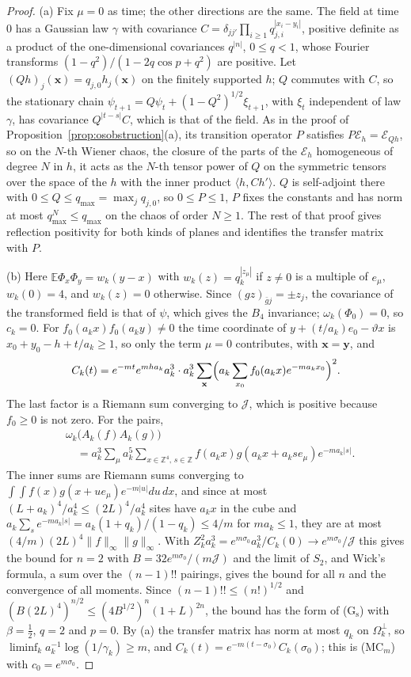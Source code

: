 \documentclass[aps,prd,twocolumn,superscriptaddress,nofootinbib,longbibliography,floatfix,amsmath,amssymb,10pt]{revtex4-2}
\theoremstyle{definition}
\theoremstyle{remark}
\newcommand{\Z}{\mathbb{Z}}
\newcommand{\E}{\mathbb{E}}
\newcommand{\ip}[2]{\langle #1,#2\rangle}
\begin{document}
\begin{proof}
(a) Fix $\mu=0$ as time; the other directions are the same. The field at
time $0$ has a Gaussian law $\gamma$ with covariance $C=\delta_{jj'}
\prod_{i\ge1}q_{j,i}^{|x_i-y_i|}$, positive definite as a product of the
one-dimensional covariances $q^{|n|}$, $0\le q<1$, whose Fourier transforms
$(1-q^2)/(1-2q\cos p+q^2)$ are positive. Let $(Qh)_j(\mathbf x)=q_{j,0}
h_j(\mathbf x)$ on the finitely supported $h$; $Q$ commutes with $C$, so the
stationary chain $\psi_{t+1}=Q\psi_t+(1-Q^2)^{1/2}\xi_{t+1}$, with $\xi_t$
independent of law $\gamma$, has covariance $Q^{|t-s|}C$, which is that of
the field. As in the proof of Proposition~\ref{prop:osobstruction}(a), its
transition operator $P$ satisfies $P\mathcal E_h=\mathcal E_{Qh}$, so on the
$N$-th Wiener chaos, the closure of the parts of the $\mathcal E_h$
homogeneous of degree $N$ in $h$, it acts as the $N$-th tensor power of $Q$
on the symmetric tensors over the space of the $h$ with the inner product
$\ip h{Ch'}$. $Q$ is self-adjoint there with $0\le Q\le q_{\max}=\max_j
q_{j,0}$, so $0\le P\le1$, $P$ fixes the constants and has norm at most
$q_{\max}^N\le q_{\max}$ on the chaos of order $N\ge1$. The rest of that
proof gives reflection positivity for both kinds of planes and identifies
the transfer matrix with $P$.

(b) Here $\E\Phi_x\Phi_y=w_k(y-x)$ with $w_k(z)=q_k^{|z_\mu|}$ if $z\ne0$
is a multiple of $e_\mu$, $w_k(0)=4$, and $w_k(z)=0$ otherwise. Since $(gz)_{\bar gj}=\pm z_j$, the covariance of the
transformed field is that of $\psi$, which gives the $B_4$ invariance;
$\omega_k(\Phi_0)=0$, so $c_k=0$. For $f_0(a_kx)f_0(a_ky)\ne0$ the time
coordinate of $y+(t/a_k)e_0-\vartheta x$ is $x_0+y_0-h+t/a_k\ge1$, so only
the term $\mu=0$ contributes, with $\mathbf x=\mathbf y$, and
\[
C_k(t)=e^{-mt}e^{mha_k}a_k^3\cdot a_k^3\sum_{\mathbf x}\Bigl(a_k
\sum_{x_0}f_0(a_kx)e^{-ma_kx_0}\Bigr)^2 .
\]
The last factor is a Riemann sum converging to $\mathcal J$, which is
positive because $f_0\ge0$ is not zero. For the pairs,
\[
\begin{split}
&\omega_k\bigl(A_k(f)A_k(g)\bigr)\\
&\quad=a_k^3\sum_\mu a_k^5\sum_{x\in\Z^4,\,s\in\Z}f(a_kx)g(a_kx+a_kse_\mu)
e^{-ma_k|s|} .
\end{split}
\]
The inner sums are Riemann sums converging to $\int\!\int f(x)g(x+ue_\mu)
e^{-m|u|}du\,dx$, and since at most $(L+a_k)^4/a_k^4\le(2L)^4/a_k^4$ sites
have $a_kx$ in the cube and $a_k\sum_se^{-ma_k|s|}=a_k(1+q_k)/(1-q_k)\le4/m$
for $ma_k\le1$, they are at most $(4/m)(2L)^4\|f\|_\infty\|g\|_\infty$.
With $Z_k^2a_k^3=e^{m\sigma_0}a_k^3/C_k(0)\to e^{m\sigma_0}/\mathcal J$ this
gives the bound for $n=2$ with $B=32e^{m\sigma_0}/(m\mathcal J)$ and the
limit of $S_2$, and Wick's formula, a sum over the $(n-1)!!$ pairings,
gives the bound for all $n$ and the convergence of all moments. Since
$(n-1)!!\le(n!)^{1/2}$ and $(B(2L)^4)^{n/2}\le(4B^{1/2})^n(1+L)^{2n}$, the
bound has the form of (G$_{\mathrm s}$) with $\beta=\frac12$, $q=2$ and
$p=0$. By (a) the transfer matrix has norm at most $q_k$ on $\Omega_k^\perp$,
so $\liminf_ka_k^{-1}\log(1/\gamma_k)\ge m$, and $C_k(t)=e^{-m(t-\sigma_0)}
C_k(\sigma_0)$; this is (MC$_m$) with $c_0=e^{m\sigma_0}$.


\end{proof}
\end{document}
